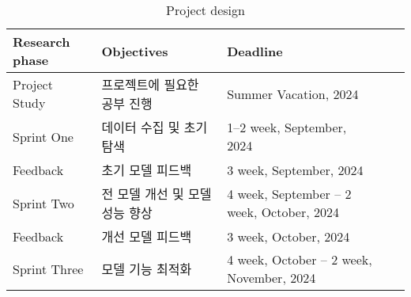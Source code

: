 \begin{longtable}[c]{@{}lllll@{}}
    \caption{Project design}
    \label{tab:my-table}\\
    \toprule
    Research phase & Objectives & Deadline \\* \midrule
    \endfirsthead
    \endhead
    \bottomrule
    \endfoot
    \endlastfoot
    Project Study & 프로젝트에 필요한 공부 진행 & Summer Vacation, 2024 \\
    Sprint One  & 데이터 수집 및 초기 탐색 & 1--2 week, September,  2024 \\ 
    Feedback & 초기 모델 피드백 & 3 week, September, 2024 \\
    Sprint Two & 전 모델 개선 및 모델 성능 향상 & 4 week, September -- 2 week, October, 2024 \\
    Feedback & 개선 모델 피드백 & 3 week, October, 2024 \\
    Sprint Three & 모델 기능 최적화 & 4 week, October -- 2 week, November, 2024 \\* 
    \bottomrule
\end{longtable}